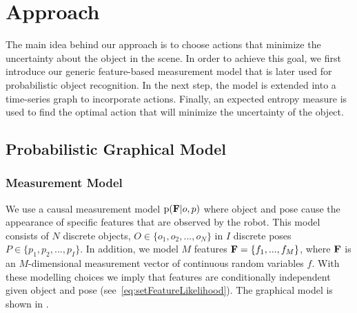     \vspace{-3ex}
\section{Approach}
    \vspace{-0.5ex}


The main idea behind our approach is to choose actions that minimize the uncertainty about the object in the scene. In order to achieve this goal, we first introduce our generic feature-based measurement model that is later used for probabilistic object recognition. In the next step, the model is extended into a time-series graph to incorporate actions. Finally, an expected entropy measure is used to find the optimal action that will minimize the uncertainty of the object.
\vspace{-1ex}
    \subsection{Probabilistic Graphical Model}
    \vspace{-0.5ex}
            
        \subsubsection{Measurement Model}
            We use a causal measurement model $\text{p}(\mathbf{F}|o,p)$ where object and pose cause the appearance of specific features that are observed by the robot. This model consists of $N$ discrete objects, $O \in \{o_1,o_2, ..., o_N\}$ in $I$ discrete poses $P \in \{p_1,p_2, ..., p_I\}$. In addition, we model $M$ features $\mathbf{F} = \left\{ f_1, ...,  f_M\right\}$, where $\mathbf{F}$ is an $M$-dimensional measurement vector of continuous random variables $f$. With these modelling choices we imply that features are conditionally independent given object and pose (see~\eqref{eq:setFeatureLikelihood}). The graphical model is shown in .

